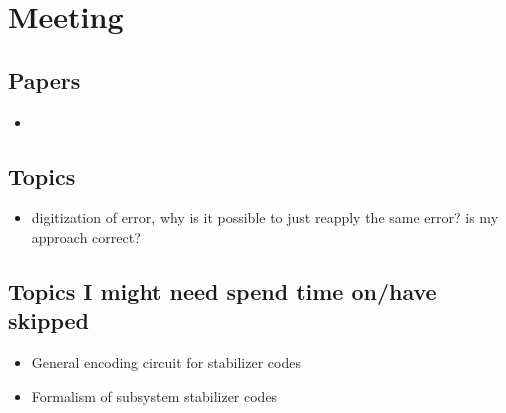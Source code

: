 \section{Meeting}

\subsection{Papers}
\begin{itemize}
    \item
\end{itemize}


\subsection{Topics}
\begin{itemize}
    \item digitization of error, why is it possible to just reapply the same error? is my approach correct?
\end{itemize}


\subsection{Topics I might need spend time on/have skipped}
\begin{itemize}
    \item General encoding circuit for stabilizer codes
    \item Formalism of subsystem stabilizer codes
\end{itemize}
